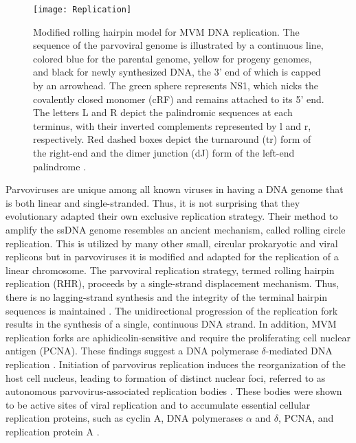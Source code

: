 \begin{figure}[h!]
\centering
  \texttt{[image: Replication]}\\[0.3cm]
  \caption[Rolling Hairpin Replication]
   {Modified rolling hairpin model for MVM DNA replication. The sequence of the parvoviral genome is illustrated by a continuous line, colored blue for the parental genome, yellow for progeny genomes, and black for newly synthesized DNA, the 3’ end of which is capped by an arrowhead. The green sphere represents NS1, which nicks the covalently closed monomer (cRF) and remains attached to its 5’ end. The letters L and R depict the palindromic sequences at each terminus, with their inverted complements represented by l and r, respectively. Red dashed boxes depict the turnaround (tr) form of the right-end and the dimer junction (dJ) form of the left-end palindrome \cite{els}. 
} 
\label{RHR}
\end{figure}

Parvoviruses are unique among all known viruses in having a DNA genome that is both linear and single-stranded. Thus, it is not surprising that they evolutionary adapted their own exclusive replication strategy. Their method to amplify the ssDNA genome resembles an ancient mechanism, called rolling circle replication. This is utilized by many other small, circular prokaryotic and viral replicons \cite{pmid1630899, pmid8374079, pmid8824773, pmid9092519, pmid9010307} but in parvoviruses it is modified and adapted for the replication of a linear chromosome. The parvoviral replication strategy, termed rolling hairpin replication (RHR), proceeds by a single-strand displacement mechanism. Thus, there is no lagging-strand synthesis and the integrity of the terminal hairpin sequences is maintained \cite{pmid967244}. The unidirectional progression of the replication fork results in the synthesis of a single, continuous DNA strand. In addition, MVM replication forks are aphidicolin-sensitive and require the proliferating cell nuclear antigen (PCNA). These findings suggest a DNA polymerase $\delta$-mediated DNA replication \cite{pmid10792046, pmid12050365, pmid9525597}. Initiation of parvovirus replication induces the reorganization of the host cell nucleus, leading to formation of distinct nuclear foci, referred to as autonomous parvovirus-associated replication bodies \cite{pmid11287588, pmid10775619, pmid11907229}. These bodies were shown to be active sites of viral replication and to accumulate essential cellular replication proteins, such as cyclin A, DNA polymerases $\alpha$ and $\delta$, PCNA, and replication protein A \cite{pmid10792046}. 



